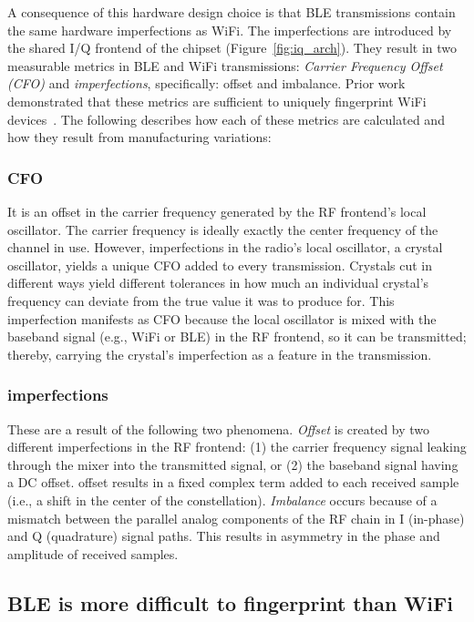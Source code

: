 A consequence of this hardware design choice is that BLE transmissions contain the
same hardware imperfections as WiFi. The imperfections are introduced by the
shared I/Q frontend of the chipset (Figure~\ref{fig:iq_arch}). They result in
two measurable metrics in BLE and WiFi transmissions: \emph{Carrier Frequency
Offset (CFO)} and \emph{\iq imperfections}, specifically: \iq offset and \iq
imbalance.  Prior work demonstrated that these metrics are sufficient to
uniquely fingerprint WiFi devices~\cite{Brik_radiometric}.
The following describes how each of these metrics are calculated and how 
they result from manufacturing variations:


\subsubsection*{CFO} It is an offset in the carrier frequency
generated by the RF frontend's local oscillator. The carrier frequency is
ideally exactly the center frequency of the channel in use. However,
imperfections in the radio's local oscillator, a crystal oscillator, yields a
unique CFO added to every transmission.  Crystals cut in different ways yield
different tolerances in how much an individual crystal's frequency can deviate
from the true value it was to produce for. This imperfection manifests as CFO
because the local oscillator is mixed with the baseband signal (e.g., WiFi or
BLE) in the RF frontend, so it can be transmitted; thereby, carrying the
crystal's imperfection as a feature in the transmission.

\subsubsection*{\iq imperfections} These are a result of the following two
phenomena. \emph{\iq Offset} is created by two different imperfections in the RF frontend: (1) the
carrier frequency signal leaking through the mixer into the transmitted signal,
or (2) the baseband signal having a DC offset. \iq offset results in a fixed
complex term added to each received \iq sample (i.e., a shift in the center of
the constellation). \emph{\iq Imbalance} occurs because of a mismatch between
the parallel analog components of the RF chain in I (in-phase) and Q
(quadrature) signal paths. This results in asymmetry in the phase and amplitude
of received \iq samples.

\subsection{BLE is more difficult to fingerprint than WiFi}
\label{sec:methodology:diff}

